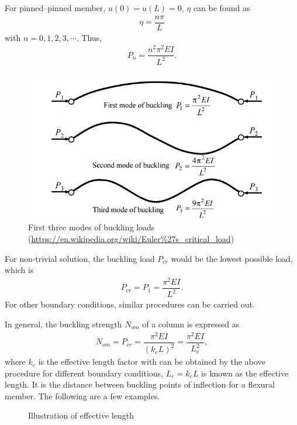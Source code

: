 For pinned--pinned member, $u(0)=u(L)=0$, $\eta$ can be found as
\begin{gather*}
\eta=\dfrac{n\pi}{L}
\end{gather*}
with $n=0,1,2,3,\cdots$. Thus,
\begin{gather*}
P_n=\dfrac{n^2\pi^2EI}{L^2}.
\end{gather*}
\begin{figure}[H]
\centering
\includegraphics[width=12cm]{PIC/CH04/BMODE}
\caption{First three modes of buckling loads (\href{https://en.wikipedia.org/wiki/Euler\%27s_critical_load}{\url{https://en.wikipedia.org/wiki/Euler\%27s_critical_load}})}
\end{figure}

For non-trivial solution, the buckling load $P_{cr}$ would be the lowest possible load, which is
\begin{gather*}
P_{cr}=P_1=\dfrac{\pi^2EI}{L^2}.
\end{gather*}
For other boundary conditions, similar procedures can be carried out.

In general, the buckling strength $N_{om}$ of a column is expressed as
\begin{gather*}
N_{om}=P_{cr}=\dfrac{\pi^2EI}{\left(k_eL\right)^2}=\dfrac{\pi^2EI}{L_e^2},
\end{gather*}
where $k_e$ is the effective length factor with can be obtained by the above procedure for different boundary conditions, $L_e=k_eL$ is known as the effective length. It is the distance between buckling points of inflection for a flexural member. The following are a few examples.
\begin{figure}[H]
\footnotesize\centering
\caption{Illustration of effective length}
\end{figure}


